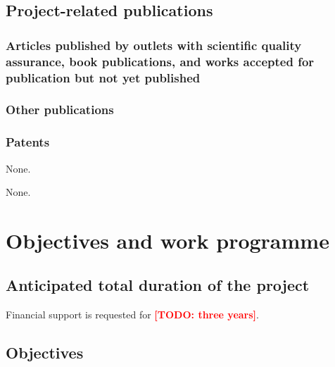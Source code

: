 \documentclass{scrartcl}
\newcommand{\todo}[1]{\xspace{\textcolor{red}{\bfseries[TODO: #1]}}\xspace}
\begin{document}
\lipsum[1]


\subsection{Project-related publications}

\subsubsection{Articles published by outlets with scientific quality assurance, book publications, and works accepted for publication but not yet published}
\printbibliography[category=reviewed, heading=none]

\subsubsection{Other publications}
\printbibliography[category=nonreviewed, heading=none]

\subsubsection{Patents}

\printbibliography[category=patents_pending, heading=none]
None.

\printbibliography[category=patents, heading=none]
None.

\section{Objectives and work programme}

\subsection{Anticipated total duration of the project}
Financial support is requested for \todo{three years}.

\subsection{Objectives}
\let\oldpara=\theparagraph
\addtocounter{secnumdepth}{1}
\renewcommand{\theparagraph}{Goal \arabic{paragraph}}
\end{document}
